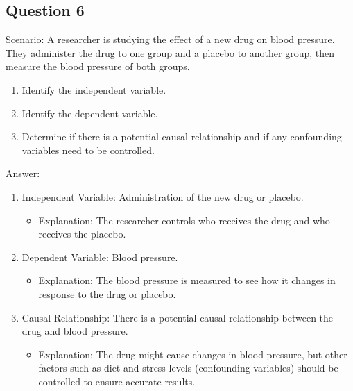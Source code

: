 \documentclass[
  letterpaper,
  DIV=11,
  numbers=noendperiod]{scrreprt}
\providecommand{\tightlist}{%
  \setlength{\itemsep}{0pt}\setlength{\parskip}{0pt}}\usepackage{longtable,booktabs,array}
\begin{document}
\subsection*{Question 6}\label{question-6}

Scenario: A researcher is studying the effect of a new drug on blood
pressure. They administer the drug to one group and a placebo to another
group, then measure the blood pressure of both groups.

\begin{enumerate}
\def\labelenumi{\arabic{enumi}.}
\tightlist
\item
  Identify the independent variable.
\item
  Identify the dependent variable.
\item
  Determine if there is a potential causal relationship and if any
  confounding variables need to be controlled.
\end{enumerate}

Answer:

\begin{enumerate}
\def\labelenumi{\arabic{enumi}.}
\tightlist
\item
  Independent Variable: Administration of the new drug or placebo.

  \begin{itemize}
  \tightlist
  \item
    Explanation: The researcher controls who receives the drug and who
    receives the placebo.
  \end{itemize}
\item
  Dependent Variable: Blood pressure.

  \begin{itemize}
  \tightlist
  \item
    Explanation: The blood pressure is measured to see how it changes in
    response to the drug or placebo.
  \end{itemize}
\item
  Causal Relationship: There is a potential causal relationship between
  the drug and blood pressure.

  \begin{itemize}
  \tightlist
  \item
    Explanation: The drug might cause changes in blood pressure, but
    other factors such as diet and stress levels (confounding variables)
    should be controlled to ensure accurate results.
  \end{itemize}
\end{enumerate}
\end{document}
